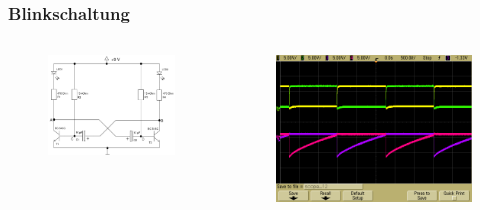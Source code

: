 \begin{frame}
    \frametitle{Blinkschaltung}
    \begin{columns}[c]
        \begin{figure}[H]
        \begin{center}
                \includegraphics[scale=0.3]{./img/schaltungen/blink_0.png}
        \end{center}
        \end{figure}
    \begin{figure}[H]
    \begin{center}
            \includegraphics[scale=0.12]{./img/oszi/Aufgabe232_220kOhm_2.png}
    \end{center}
    \end{figure}
    
    \end{columns}
\end{frame}

